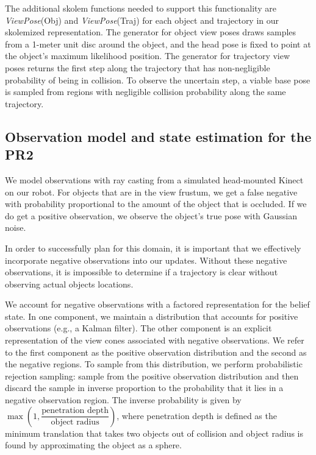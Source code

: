 The additional skolem functions needed to support this functionality
are \emph{ViewPose}(Obj) and \emph{ViewPose}(Traj) for each object and
trajectory in our skolemized representation. The generator for object
view poses draws samples from a 1-meter unit disc around the
object, and the head pose is fixed to point at the object's maximum
likelihood position. The generator for trajectory view poses returns
the first step along the trajectory that has non-negligible probability of being
in collision. To observe the uncertain step, a viable base pose is sampled from regions with negligible collision probability along the same trajectory.

\subsection{Observation model and state estimation for the PR2}
We model observations with ray casting from a simulated head-mounted
Kinect on our robot. For objects that are in the view
frustum, we get a false negative with probability proportional to the
amount of the object that is occluded. If we do get a positive
observation, we observe the object's true pose with Gaussian noise.


In order to successfully plan for this domain, it is important that we
effectively incorporate negative observations into our
updates. Without these negative observations, it is impossible to determine
if a trajectory is clear without observing actual objects
locations. 

We account for negative observations with a factored representation for
the belief state. In one component, we maintain a distribution that
accounts for positive observations (e.g., a Kalman filter). The other component is an explicit
representation of the view cones associated with negative
observations. We refer to the first component as the positive
observation distribution and the second as the negative regions. To
sample from this distribution, we perform probabilistic rejection sampling: sample from the positive observation distribution and then discard
the sample in inverse proportion to the probability that it lies in a
negative observation region. The inverse probability is given by $\max(1,\dfrac{\text{penetration depth}}{\text{object radius}})$, where penetration depth is defined as the minimum translation that takes two objects out of collision and object radius is found by approximating the object as a sphere.


